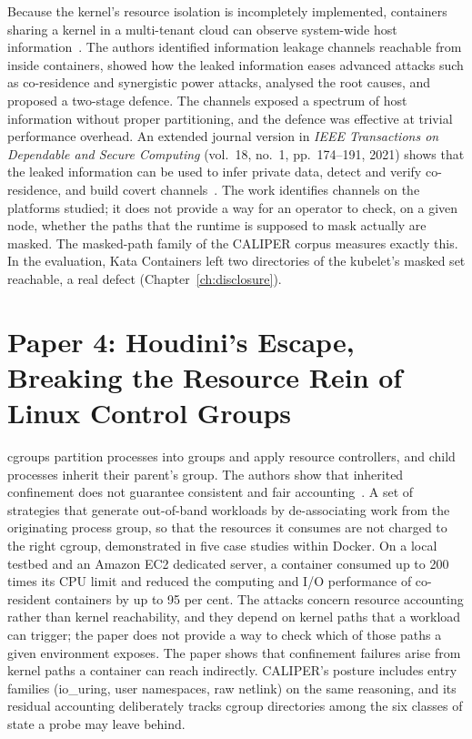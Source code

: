  Because the kernel's resource isolation is incompletely implemented, containers sharing a kernel in a multi-tenant cloud can observe system-wide host information~\cite{gao2017containerleaks}.
 The authors identified information leakage channels reachable from inside containers, showed how the leaked information eases advanced attacks such as co-residence and synergistic power attacks, analysed the root causes, and proposed a two-stage defence.
 The channels exposed a spectrum of host information without proper partitioning, and the defence was effective at trivial performance overhead. An extended journal version in \emph{IEEE Transactions on Dependable and Secure Computing} (vol.~18, no.~1, pp.~174--191, 2021) shows that the leaked information can be used to infer private data, detect and verify co-residence, and build covert channels~\cite{gao2021tdsc}.
 The work identifies channels on the platforms studied; it does not provide a way for an operator to check, on a given node, whether the paths that the runtime is supposed to mask actually are masked.
 The masked-path family of the CALIPER corpus measures exactly this. In the evaluation, Kata Containers left two directories of the kubelet's masked set reachable, a real defect (Chapter~\ref{ch:disclosure}).

\section{Paper 4: Houdini's Escape, Breaking the Resource Rein of Linux Control Groups}
\label{lit:escape}

 cgroups partition processes into groups and apply resource controllers, and child processes inherit their parent's group. The authors show that inherited confinement does not guarantee consistent and fair accounting~\cite{gao2019houdini}.
 A set of strategies that generate out-of-band workloads by de-associating work from the originating process group, so that the resources it consumes are not charged to the right cgroup, demonstrated in five case studies within Docker.
 On a local testbed and an Amazon EC2 dedicated server, a container consumed up to 200 times its CPU limit and reduced the computing and I/O performance of co-resident containers by up to 95 per cent.
 The attacks concern resource accounting rather than kernel reachability, and they depend on kernel paths that a workload can trigger; the paper does not provide a way to check which of those paths a given environment exposes.
 The paper shows that confinement failures arise from kernel paths a container can reach indirectly. CALIPER's posture includes entry families (io\_uring, user namespaces, raw netlink) on the same reasoning, and its residual accounting deliberately tracks cgroup directories among the six classes of state a probe may leave behind.

